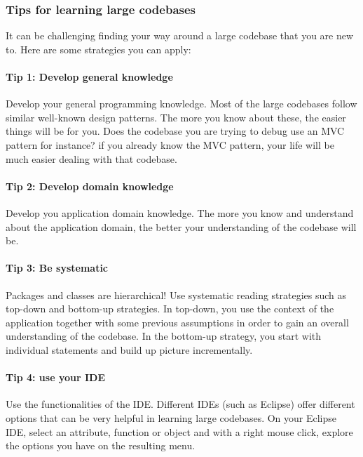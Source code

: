 \documentclass[
]{book}
\begin{document}
\hypertarget{tips}{%
\subsubsection{Tips for learning large codebases}\label{tips}}

It can be challenging finding your way around a large codebase that you are new to. Here are some strategies you can apply:

\hypertarget{tip1}{%
\paragraph{Tip 1: Develop general knowledge}\label{tip1}}

Develop your general programming knowledge. Most of the large codebases follow similar well-known design patterns. The more you know about these, the easier things will be for you. Does the codebase you are trying to debug use an MVC pattern for instance? if you already know the MVC pattern, your life will be much easier dealing with that codebase.

\hypertarget{tip2}{%
\paragraph{Tip 2: Develop domain knowledge}\label{tip2}}

Develop you application domain knowledge. The more you know and understand about the application domain, the better your understanding of the codebase will be.

\hypertarget{tip3}{%
\paragraph{Tip 3: Be systematic}\label{tip3}}

Packages and classes are hierarchical! Use systematic reading strategies such as top-down and bottom-up strategies. In top-down, you use the context of the application together with some previous assumptions in order to gain an overall understanding of the codebase. In the bottom-up strategy, you start with individual statements and build up picture incrementally.

\hypertarget{tip4}{%
\paragraph{Tip 4: use your IDE}\label{tip4}}

Use the functionalities of the IDE. Different IDEs (such as Eclipse) offer different options that can be very helpful in learning large codebases. On your Eclipse IDE, select an attribute, function or object and with a right mouse click, explore the options you have on the resulting menu.
\end{document}
